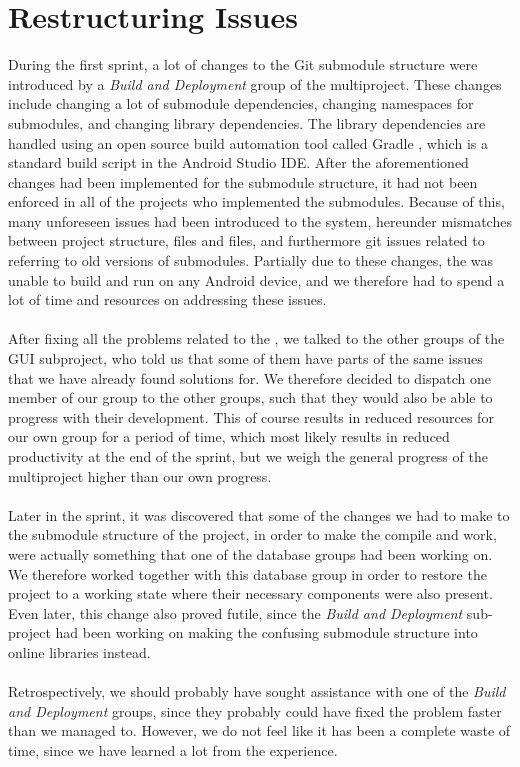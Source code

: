 \section{Restructuring Issues}
\label{sec:restructuring_issues}

During the first sprint, a lot of changes to the Git submodule structure were introduced by a \emph{Build and Deployment} group of the multiproject. These changes include changing a lot of submodule dependencies, changing namespaces for submodules, and changing library dependencies. The library dependencies are handled using an open source build automation tool called Gradle \parencite{gradle}, which is a standard build script in the Android Studio IDE. After the aforementioned changes had been implemented for the submodule structure, it had not been enforced in all of the \giraf projects who implemented the submodules. Because of this, many unforeseen issues had been introduced to the system, hereunder mismatches between project structure,  files and  files, and furthermore git issues related to referring to old versions of submodules. Partially due to these changes, the \ct was unable to build and run on any Android device, and we therefore had to spend a lot of time and resources on addressing these issues. 
\\\\
After fixing all the problems related to the \ct, we talked to the other groups of the GUI subproject, who told us that some of them have parts of the same issues that we have already found solutions for. We therefore decided to dispatch one member of our group to the other groups, such that they would also be able to progress with their development. This of course results in reduced resources for our own group for a period of time, which most likely results in reduced productivity at the end of the sprint, but we weigh the general progress of the multiproject higher than our own progress.
\\\\
Later in the sprint, it was discovered that some of the changes we had to make to the submodule structure of the project, in order to make the \ct compile and work, were actually something that one of the database groups had been working on. We therefore worked together with this database group in order to restore the project to a working state where their necessary components were also present. Even later, this change also proved futile, since the \emph{Build and Deployment} sub-project had been working on making the confusing submodule structure into online libraries instead. 
\\\\
Retrospectively, we should probably have sought assistance with one of the \emph{Build and Deployment} groups, since they probably could have fixed the problem faster than we managed to. However, we do not feel like it has been a complete waste of time, since we have learned a lot from the experience.